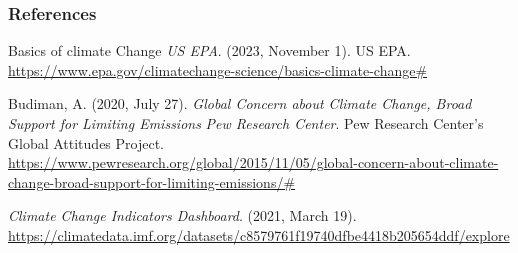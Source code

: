 \documentclass[
]{article}
\begin{document}
\hypertarget{references}{%
\subsubsection{References}\label{references}}

Basics of climate Change \textbar{} \emph{US EPA}. (2023, November 1).
US EPA.
\url{https://www.epa.gov/climatechange-science/basics-climate-change\#}

Budiman, A. (2020, July 27). \emph{Global Concern about Climate Change,
Broad Support for Limiting Emissions} \textbar{} \emph{Pew Research
Center}. Pew Research Center's Global Attitudes Project.
\url{https://www.pewresearch.org/global/2015/11/05/global-concern-about-climate-change-broad-support-for-limiting-emissions/\#}

\emph{Climate Change Indicators Dashboard}. (2021, March 19).
\url{https://climatedata.imf.org/datasets/c8579761f19740dfbe4418b205654ddf/explore}
\end{document}
